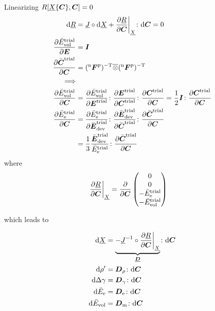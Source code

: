 \documentclass[a4paper,11pt]{article}
\newcommand{\ootimes}{\overline{\otimes}}
\newcommand{\ts}[1]{\text{\boldmath $#1$}}
\newcommand{\pderiv}[2]{\frac{\partial #1}{\partial #2}}
\newcommand{\dev}{{\rm dev}}
\newcommand{\vol}{{\rm vol}}
\newcommand{\trial}{{\rm trial}}
\newcommand{\rmd}{{\rm d}}
\newcommand{\rme}{{\rm e}}
\newcommand{\rmm}{{\rm m}}
\newcommand{\rmp}{{\rm p}}
\newcommand{\rmT}{{\rm T}}
\newcommand{\old}{{}^{\rm n}}
\begin{document}
Linearizing $R[\underline X\{\ts C\},\ts C] = 0$
\begin{align*}
	\rmd\underline R &= \underline J\circ\rmd\underline X + \pderiv{\underline R}{\ts C}\bigg|_{\underline X}\colon\rmd\ts C = 0\\
	\pderiv{\bar{E}_\vol^\trial}{\ts E} &= \ts I\\
	\pderiv{\bar{\ts C}^\trial}{\ts C} &= (\old\ts F^\rmp)^{-\rmT}\ootimes(\old\ts F^\rmp)^{-\rmT}\\
	\Longrightarrow\\
	\pderiv{\bar{E}_\vol^\trial}{\ts C} &= \pderiv{\bar{E}_\vol^\trial}{\ts E^\trial}\colon\pderiv{\ts E^\trial}{\ts C^\trial}
		\colon\pderiv{\ts C^\trial}{\ts C} 
		=\frac12 \ts I\colon\pderiv{\ts C^\trial}{\ts C} \\
	\pderiv{\bar{E}_\rme^\trial}{\ts C} &= 
		\pderiv{\bar{E}_\rme^\trial}{\bar{\ts E}_\dev^\trial}\colon
		\pderiv{\bar{\ts E}_\dev^\trial}{\bar{\ts C}^\trial}\colon
		\pderiv{\bar{\ts C}^\trial}{\ts C} \\
		&= \frac13\frac{\bar{\ts E}_\dev^\trial}{\bar{E}_\rme^\trial}\colon
		\pderiv{\bar{\ts C}^\trial}{\ts C}
\end{align*}
where 
\begin{align*}
	\pderiv{\underline R}{\ts C}\bigg|_{\underline X} &= \pderiv{}{\ts C}\begin{pmatrix}0\\0\\ 
		-\bar E_\rme^\trial\\
		-\bar E_\vol^\trial\\
		\end{pmatrix}
\end{align*}

which leads to 

\begin{align*}
	\rmd\underline X &= \underbrace{-\underline J^{-1}\circ\pderiv{\underline R}{\ts C}\bigg|_{\underline X}}_{\underline{\ts D}}\colon\rmd\ts C\\
	\rmd\rho' &= \ts D_{\rho} \colon\rmd\ts C\\
	\rmd\Delta\gamma &= \ts D_\gamma \colon\rmd\ts C\\
	\rmd\bar E_\rme &= \ts D_\rme \colon\rmd\ts C\\
	\rmd\bar E_\vol &= \ts D_\rmm \colon\rmd\ts C
\end{align*}
\end{document}

